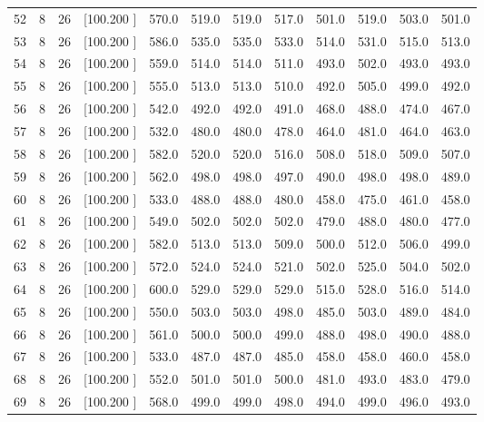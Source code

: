 \documentclass[12pt,a4paper]{article}
\begin{document}
\begin{center}
{\begin{tabular}{r r r r r r r r r r r r}
  52&  8& 26&[100.200   ]&   570.0&   519.0&   519.0&   517.0&   501.0&   519.0&   503.0&   501.0\\[-0.02in]
  53&  8& 26&[100.200   ]&   586.0&   535.0&   535.0&   533.0&   514.0&   531.0&   515.0&   513.0\\[-0.02in]
  54&  8& 26&[100.200   ]&   559.0&   514.0&   514.0&   511.0&   493.0&   502.0&   493.0&   493.0\\[-0.02in]
  55&  8& 26&[100.200   ]&   555.0&   513.0&   513.0&   510.0&   492.0&   505.0&   499.0&   492.0\\[-0.02in]
  56&  8& 26&[100.200   ]&   542.0&   492.0&   492.0&   491.0&   468.0&   488.0&   474.0&   467.0\\[-0.02in]
  57&  8& 26&[100.200   ]&   532.0&   480.0&   480.0&   478.0&   464.0&   481.0&   464.0&   463.0\\[-0.02in]
  58&  8& 26&[100.200   ]&   582.0&   520.0&   520.0&   516.0&   508.0&   518.0&   509.0&   507.0\\[-0.02in]
  59&  8& 26&[100.200   ]&   562.0&   498.0&   498.0&   497.0&   490.0&   498.0&   498.0&   489.0\\[-0.02in]
  60&  8& 26&[100.200   ]&   533.0&   488.0&   488.0&   480.0&   458.0&   475.0&   461.0&   458.0\\[-0.02in]
  61&  8& 26&[100.200   ]&   549.0&   502.0&   502.0&   502.0&   479.0&   488.0&   480.0&   477.0\\[-0.02in]
  62&  8& 26&[100.200   ]&   582.0&   513.0&   513.0&   509.0&   500.0&   512.0&   506.0&   499.0\\[-0.02in]
  63&  8& 26&[100.200   ]&   572.0&   524.0&   524.0&   521.0&   502.0&   525.0&   504.0&   502.0\\[-0.02in]
  64&  8& 26&[100.200   ]&   600.0&   529.0&   529.0&   529.0&   515.0&   528.0&   516.0&   514.0\\[-0.02in]
  65&  8& 26&[100.200   ]&   550.0&   503.0&   503.0&   498.0&   485.0&   503.0&   489.0&   484.0\\[-0.02in]
  66&  8& 26&[100.200   ]&   561.0&   500.0&   500.0&   499.0&   488.0&   498.0&   490.0&   488.0\\[-0.02in]
  67&  8& 26&[100.200   ]&   533.0&   487.0&   487.0&   485.0&   458.0&   458.0&   460.0&   458.0\\[-0.02in]
  68&  8& 26&[100.200   ]&   552.0&   501.0&   501.0&   500.0&   481.0&   493.0&   483.0&   479.0\\[-0.02in]
  69&  8& 26&[100.200   ]&   568.0&   499.0&   499.0&   498.0&   494.0&   499.0&   496.0&   493.0\\[-0.02in]

\end{tabular}}
\end{center}
\end{document}
